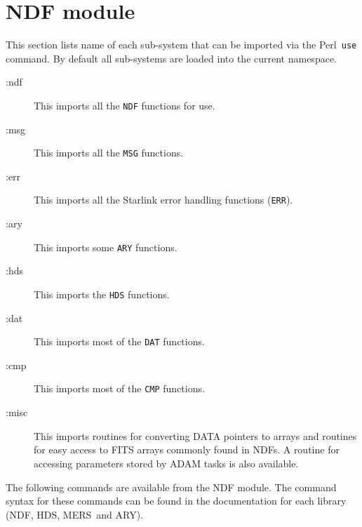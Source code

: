 \documentclass[twoside,11pt]{article}
\newcommand{\ndf}{\xref{NDF}{sun33}{}}
\newcommand{\perl}{\xref{\textsf{Perl}}{sun193}{}}
\newcommand{\hds}{\xref{HDS}{sun92}{}}
\newcommand{\ary}{\xref{ARY}{sun11}{}}
\newcommand{\mers}{\xref{MERS}{sun104}{}}
\newcommand{\xref}[3]{#1}
\renewcommand{\_}{\texttt{\symbol{95}}}
\begin{document}
\section{NDF module\label{ndfapp}}

This section lists name of each sub-system that can be imported via the 
\perl\ \texttt{use} command. By default all sub-systems are loaded into the
current namespace.

\begin{description}

\item[:ndf] \mbox{}

This imports all the \texttt{NDF\_} functions for use.

\item[:msg] \mbox{}

This imports all the \texttt{MSG\_} functions.

\item[:err] \mbox{}

This imports all the Starlink error handling functions (\texttt{ERR\_}).

\item[:ary] \mbox{}

This imports some \texttt{ARY\_} functions.

\item[:hds] \mbox{}

This imports the \texttt{HDS\_} functions.

\item[:dat] \mbox{}

This imports most of the \texttt{DAT\_} functions.

\item[:cmp] \mbox{}

This imports most of the \texttt{CMP\_} functions.

\item[:misc] \mbox{}

This imports routines for converting DATA pointers to arrays and routines for 
easy access to FITS arrays commonly found in NDFs. A routine for accessing
parameters stored by ADAM tasks is also available.

\end{description}

The following commands are available from the NDF module.
The command syntax for these commands can be found in the documentation
for each library (\ndf, \hds, \mers\ and \ary).
\end{document}

